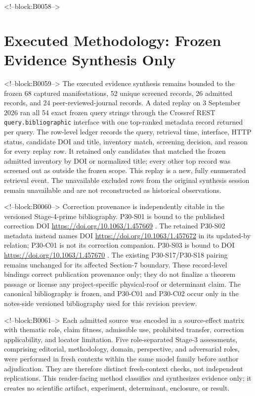\documentclass[11pt,a4paper]{article}
\begin{document}
<!--block:B0058-->
\section{Executed Methodology: Frozen Evidence Synthesis Only}

<!--block:B0059-->
The executed evidence synthesis remains bounded to the frozen 68 captured
manifestations, 52 unique screened records, 26 admitted records, and 24
peer-reviewed-journal records.  A dated replay on 3 September 2026 ran all
54 exact frozen query strings through the Crossref REST
\texttt{query.bibliographic} interface with one top-ranked metadata record
returned per query.  The row-level ledger records the query, retrieval time,
interface, HTTP status, candidate DOI and title, inventory match, screening
decision, and reason for every replay row.  It retained only candidates that
matched the frozen admitted inventory by DOI or normalized title; every other
top record was screened out as outside the frozen scope.  This replay is a new,
fully enumerated retrieval event.  The unavailable excluded rows from the
original synthesis session remain unavailable and are not reconstructed as
historical observations.

<!--block:B0060-->
Correction provenance is independently citable in the versioned Stage-4-prime
bibliography. P30-S01 is bound to the published correction
DOI \url{https://doi.org/10.1063/1.457669} \citep{P30-C01}. The retained
P30-S02 metadata instead names DOI \url{https://doi.org/10.1063/1.457672}
in its updated-by relation; P30-C01 is not its correction companion. P30-S03
is bound to DOI \url{https://doi.org/10.1063/1.457670} \citep{P30-C02}.
The existing P30-S17/P30-S18 pairing remains unchanged for its affected Section-7
boundary. These record-level bindings correct publication provenance only; they
do not finalize a theorem passage or license any project-specific physical-roof
or determinant claim. The canonical bibliography is frozen, and P30-C01 and
P30-C02 occur only in the notes-side versioned bibliography used for this revision preview.

<!--block:B0061-->
Each admitted source was encoded in a source-effect matrix with thematic role,
claim fitness, admissible use, prohibited transfer, correction applicability,
and locator limitation. Five role-separated Stage-3 assessments, comprising
editorial, methodology, domain, perspective, and adversarial roles, were performed
in fresh contexts within the same model family before author adjudication.
They are therefore distinct fresh-context checks, not independent replications.
This reader-facing method classifies and synthesizes evidence only; it creates
no scientific artifact, experiment, determinant, enclosure, or result.
\end{document}
